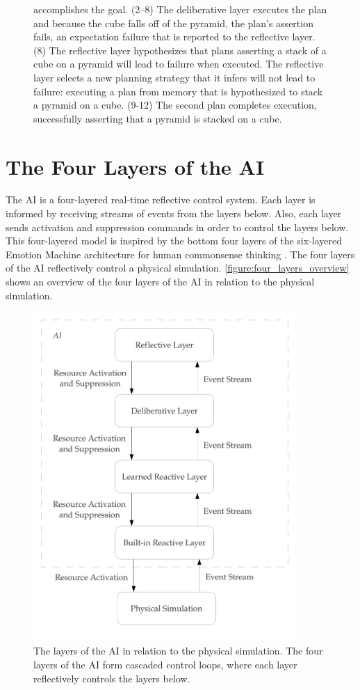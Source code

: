 \begin{figure}
{  accomplishes the goal.  (2--8) The deliberative layer executes the
  plan and because the cube falls off of the pyramid, the plan's
  assertion fails, an expectation failure that is reported to the
  reflective layer.  (8) The reflective layer hypothesizes that plans
  asserting a stack of a cube on a pyramid will lead to failure when
  executed.  The reflective layer selects a new planning strategy that
  it infers will not lead to failure: executing a plan from memory
  that is hypothesized to stack a pyramid on a cube.  (9-12) The
  second plan completes execution, successfully asserting that a
  pyramid is stacked on a cube.}
\label{figure:implemented_example_learning_storyboard}
\end{figure}

\section{The Four Layers of the AI}

The AI is a four-layered real-time reflective control system.  Each
layer is informed by receiving streams of events from the layers
below.  Also, each layer sends activation and suppression commands in
order to control the layers below.  This four-layered model is
inspired by the bottom four layers of the six-layered Emotion Machine
architecture for human commonsense thinking \cite[]{minsky:2006}.  The
four layers of the AI reflectively control a physical simulation.
{\mbox{\autoref{figure:four_layers_overview}}} shows an overview of
the four layers of the AI in relation to the physical simulation.
\begin{figure}
\begin{center}
\includegraphics[width=10cm]{gfx/four_layers_overview}
\end{center}
\caption[The four layers of the AI in relation to the physical
  simulation.]{The layers of the AI in relation to the physical
  simulation.  The four layers of the AI form cascaded control loops,
  where each layer reflectively controls the layers below.}
\label{figure:four_layers_overview}
\end{figure}


